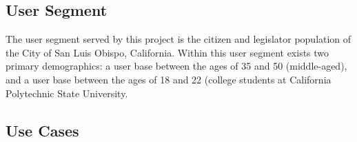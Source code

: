 \documentclass[12pt,oneside,letterpaper]{article}
\newcounter{use_case}
\newcounter{functional_requirement}
\begin{document}
\subsection{User Segment}
The user segment served by this project is the citizen and legislator population of
the City of San Luis Obispo, California. Within this user segment
exists two primary demographics: a user base between the ages of 35 and 50
(middle-aged), and a user base between the ages of 18 and 22 (college students
at California Polytechnic State University.
\subsection{Use Cases}


% 
\end{document}

